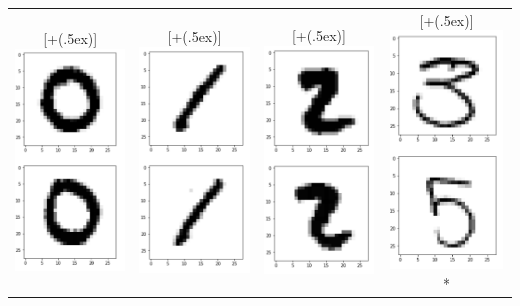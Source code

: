 \documentclass[11pt,letterpaper]{article}
\newcommand*{\addheight}[2][.5ex]{%
  \raisebox{0pt}[\dimexpr\height+(#1)\relax]{#2}%
}
\begin{document}
\begin{tabular}{|c|c|c|c|}
      \hline
      \addheight{\includegraphics[width=30mm]{img/1-d/0.png}} &
      \addheight{\includegraphics[width=30mm]{img/1-d/1.png}} &
      \addheight{\includegraphics[width=30mm]{img/1-d/2.png}} &
      \addheight{\includegraphics[width=30mm]{img/1-d/3.png}}* \\

\end{tabular}
\end{document}
